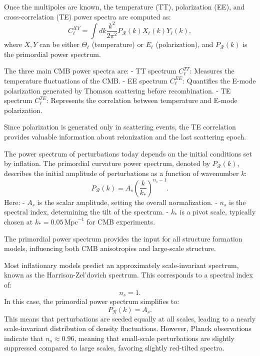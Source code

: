 \documentclass{aa}
\begin{document}
Once the multipoles are known, the temperature (TT), polarization (EE), and cross-correlation (TE) power spectra are computed as:
\begin{equation}
C_\ell^{XY} = \int dk \frac{k^2}{2\pi^2} P_{\mathcal{R}}(k) X_\ell(k) Y_\ell(k),
\end{equation}
where $X, Y$ can be either $\Theta_\ell$ (temperature) or $E_\ell$ (polarization), and $P_{\mathcal{R}}(k)$ is the primordial power spectrum.  

The three main CMB power spectra are:  
- TT spectrum $C_\ell^{TT}$: Measures the temperature fluctuations of the CMB.  
- EE spectrum $C_\ell^{EE}$: Quantifies the E-mode polarization generated by Thomson scattering before recombination.  
- TE spectrum $C_\ell^{TE}$: Represents the correlation between temperature and E-mode polarization.  

Since polarization is generated only in scattering events, the TE correlation provides valuable information about reionization and the last scattering epoch.  

The power spectrum of perturbations today depends on the initial conditions set by inflation. The primordial curvature power spectrum, denoted by $P_{\mathcal{R}}(k)$, describes the initial amplitude of perturbations as a function of wavenumber $k$:
\begin{equation}
P_{\mathcal{R}}(k) = A_s \left(\frac{k}{k_*}\right)^{n_s - 1}.
\end{equation}
Here:
- $A_s$ is the scalar amplitude, setting the overall normalization.  
- $n_s$ is the spectral index, determining the tilt of the spectrum.  
- $k_*$ is a pivot scale, typically chosen at $k_* = 0.05 \, \text{Mpc}^{-1}$ for CMB experiments.  

The primordial power spectrum provides the input for all structure formation models, influencing both CMB anisotropies and large-scale structure.

Most inflationary models predict an approximately scale-invariant spectrum, known as the Harrison-Zel'dovich spectrum. This corresponds to a spectral index of:
\begin{equation}
n_s = 1.
\end{equation}
In this case, the primordial power spectrum simplifies to:
\begin{equation}
P_{\mathcal{R}}(k) = A_s.
\end{equation}
This means that perturbations are seeded equally at all scales, leading to a nearly scale-invariant distribution of density fluctuations. However, Planck observations indicate that $n_s \approx 0.96$, meaning that small-scale perturbations are slightly suppressed compared to large scales, favoring slightly red-tilted spectra.
\end{document}
